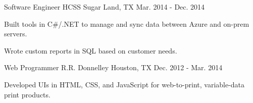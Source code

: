 \begin{cventries}
\cventry
{Software Engineer} %
{HCSS} %
{Sugar Land, TX} %
{Mar. 2014 - Dec. 2014} %
{
\begin{cvitems}
\item {Built tools in C\#/.NET to manage and sync data between Azure and on-prem servers.}
\item {Wrote custom reports in SQL based on customer needs.}
\end{cvitems}
}


\cventry
{Web Programmer} %
{R.R. Donnelley} %
{Houston, TX} %
{Dec. 2012 - Mar. 2014} %
{
\begin{cvitems}
\item {Developed UIs in HTML, CSS, and JavaScript for web-to-print, variable-data print products.}
\end{cvitems}
}


\end{cventries}
